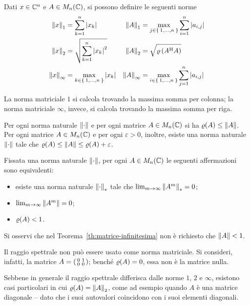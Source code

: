 	\begin{esempio}
		Dati \(x \in \mathbb{C}^n\) e \(A \in M_n (\mathbb{C})\), si possono definire le seguenti norme
		\begin{subequations}
		\begin{align}
			\norm{x}_1 &= \sum_{k = 1}^n \abs{x_k} & \norm{A}_1 &= \max_{j \in \Set{1, \dots, n}} \sum_{i = 1}^n \abs{a_{i, j}} \\
			\norm{x}_2 &= \sqrt{\sum_{k = 1}^n \abs{x_k}^2} & \norm{A}_2 &= \sqrt{\operatorname{\varrho} \qty(A^\mathrm{H}\relax A)} \\
			\norm{x}_\infty &= \max_{k \in \Set{1, \dots, n}} \abs{x_k} & \norm{A}_\infty &= \max_{i \in \Set{1, \dots, n}} \sum_{j = 1}^n \abs{a_{i, j}}
		\end{align}
		\end{subequations}
	
		La norma matriciale \(1\) si calcola trovando la massima somma per colonna; la norma matriciale \(\infty\), invece, si calcola trovando la massima somma per riga.
	\end{esempio}

	\begin{teorema}
		Per ogni norma naturale \(\norm{\cdot}\) e per ogni matrice \(A \in M_n (\mathbb{C})\) si ha \(\operatorname{\varrho} (A) \le \norm{A}\). Per ogni matrice \(A \in M_n (\mathbb{C})\) e per ogni \(\varepsilon > 0\), inoltre, esiste una norma naturale \(\norm{\cdot}\) tale che \(\operatorname{\varrho} (A) \le \norm{A} \le \operatorname{\varrho} (A) + \varepsilon\).
	\end{teorema}

	\begin{teorema}\label{th:matrice-infinitesima}
		Fissata una norma naturale \(\norm{\cdot}\), per ogni \(A \in M_n (\mathbb{C})\) le seguenti affermazioni sono equivalenti:
		\begin{itemize}
			\item esiste una norma naturale \(\norm{\cdot}_*\) tale che \(\lim_{m \to \infty} \norm{A^m}_* = 0\);
			\item \(\lim_{m \to \infty} \norm{A^m} = 0\);
			\item \(\operatorname{\varrho} (A) < 1\).
		\end{itemize}
	\end{teorema}

	Si osservi che nel Teorema~\ref{th:matrice-infinitesima} non è richiesto che \(\norm{A} < 1\).
	
	\begin{osservazione}
		Il raggio spettrale non può essere usato come norma matriciale. Si consideri, infatti, la matrice \(A = \begin{psmallmatrix} 0 & 1 \\ 0 & 0 \end{psmallmatrix}\); benché \(\operatorname{\varrho} (A) = 0\), essa non è la matrice nulla.
		
		Sebbene in generale il raggio spettrale differisca dalle norme \(1\), \(2\) e \(\infty\), esistono casi particolari in cui \(\operatorname{\varrho} (A) = \norm{A}_2\), come ad esempio quando \(A\) è una matrice diagonale -- dato che i suoi autovalori coincidono con i suoi elementi diagonali.
	\end{osservazione}

